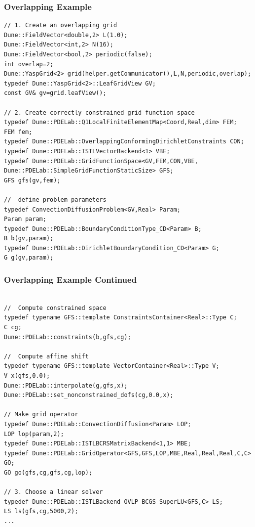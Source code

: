 \begin{frame}[fragile]
  \frametitle{Overlapping Example}
  \begin{lstlisting}[basicstyle=\tiny]
// 1. Create an overlapping grid
Dune::FieldVector<double,2> L(1.0);
Dune::FieldVector<int,2> N(16);
Dune::FieldVector<bool,2> periodic(false);
int overlap=2; 
Dune::YaspGrid<2> grid(helper.getCommunicator(),L,N,periodic,overlap);
typedef Dune::YaspGrid<2>::LeafGridView GV;
const GV& gv=grid.leafView();

// 2. Create correctly constrained grid function space
typedef Dune::PDELab::Q1LocalFiniteElementMap<Coord,Real,dim> FEM;
FEM fem;
typedef Dune::PDELab::OverlappingConformingDirichletConstraints CON;
typedef Dune::PDELab::ISTLVectorBackend<1> VBE;
typedef Dune::PDELab::GridFunctionSpace<GV,FEM,CON,VBE,
Dune::PDELab::SimpleGridFunctionStaticSize> GFS;
GFS gfs(gv,fem);

//  define problem parameters
typedef ConvectionDiffusionProblem<GV,Real> Param;
Param param;
typedef Dune::PDELab::BoundaryConditionType_CD<Param> B;
B b(gv,param);
typedef Dune::PDELab::DirichletBoundaryCondition_CD<Param> G;
G g(gv,param);
\end{lstlisting}  
\end{frame}
\begin{frame}[fragile]
\frametitle<presentation>{Overlapping Example Continued}
  \begin{lstlisting}[basicstyle=\tiny]

//  Compute constrained space
typedef typename GFS::template ConstraintsContainer<Real>::Type C;
C cg;
Dune::PDELab::constraints(b,gfs,cg);

//  Compute affine shift
typedef typename GFS::template VectorContainer<Real>::Type V;
V x(gfs,0.0);
Dune::PDELab::interpolate(g,gfs,x);
Dune::PDELab::set_nonconstrained_dofs(cg,0.0,x);

// Make grid operator
typedef Dune::PDELab::ConvectionDiffusion<Param> LOP; 
LOP lop(param,2);
typedef Dune::PDELab::ISTLBCRSMatrixBackend<1,1> MBE;
typedef Dune::PDELab::GridOperator<GFS,GFS,LOP,MBE,Real,Real,Real,C,C> GO;
GO go(gfs,cg,gfs,cg,lop);

// 3. Choose a linear solver 
typedef Dune::PDELab::ISTLBackend_OVLP_BCGS_SuperLU<GFS,C> LS;
LS ls(gfs,cg,5000,2);
...
\end{lstlisting}
  
\end{frame}

\cleardoublepage


